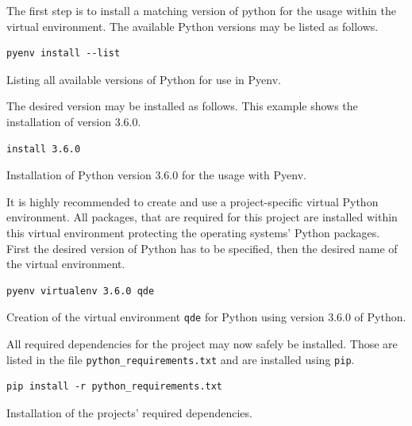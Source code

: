 \documentclass[10pt, openright, notitlepage]{scrreprt}
\begin{document}
The first step is to install a matching version of python for the usage within
the virtual environment. The available Python versions may be listed as follows.

\begin{listing}[H]
\begin{verbatim}
pyenv install --list
\end{verbatim}
\caption{\label{fig:impl-pyenv-list}
Listing all available versions of Python for use in Pyenv.}
\end{listing}

The desired version may be installed as follows. This example shows the
installation of version 3.6.0.

\begin{listing}[H]
\begin{verbatim}
install 3.6.0
\end{verbatim}
\caption{\label{fig:impl-pyenv-install}
Installation of Python version 3.6.0 for the usage with Pyenv.}
\end{listing}

It is highly recommended to create and use a project-specific virtual Python
environment. All packages, that are required for this project are installed
within this virtual environment protecting the operating systems' Python
packages.
First the desired version of Python has to be specified, then the desired name
of the virtual environment.

\begin{listing}[H]
\begin{verbatim}
pyenv virtualenv 3.6.0 qde
\end{verbatim}
\caption{\label{fig:impl-pyenv-venv}
Creation of the virtual environment \texttt{qde} for Python using version 3.6.0 of Python.}
\end{listing}

All required dependencies for the project may now safely be installed. Those are
listed in the file \texttt{python\_requirements.txt} and are installed using \texttt{pip}.

\begin{listing}[H]
\begin{verbatim}
pip install -r python_requirements.txt
\end{verbatim}
\caption{\label{fig:impl-pip-install}
Installation of the projects' required dependencies.}
\end{listing}
\end{document}
